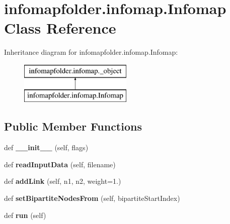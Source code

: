 \hypertarget{classinfomapfolder_1_1infomap_1_1Infomap}{}\section{infomapfolder.\+infomap.\+Infomap Class Reference}
\label{classinfomapfolder_1_1infomap_1_1Infomap}
Inheritance diagram for infomapfolder.\+infomap.\+Infomap\+:\begin{figure}[H]
\begin{center}
\leavevmode
\includegraphics[height=2.000000cm]{classinfomapfolder_1_1infomap_1_1Infomap}
\end{center}
\end{figure}
\subsection*{Public Member Functions}
\begin{DoxyCompactItemize}
\item 
\mbox{\label{classinfomapfolder_1_1infomap_1_1Infomap_aaff19679a8b96df2964007d33d1e7852}} 
def {\bfseries \+\_\+\+\_\+init\+\_\+\+\_\+} (self, flags)
\item 
\mbox{\label{classinfomapfolder_1_1infomap_1_1Infomap_ac378e2ba091a4b2bf40e989bf3cc54ed}} 
def {\bfseries read\+Input\+Data} (self, filename)
\item 
\mbox{\label{classinfomapfolder_1_1infomap_1_1Infomap_a1e6de8e85de69eba7082dd6628d794b1}} 
def {\bfseries add\+Link} (self, n1, n2, weight=1.)
\item 
\mbox{\label{classinfomapfolder_1_1infomap_1_1Infomap_ae0e760c416f6153e71810e62a2fda29f}} 
def {\bfseries set\+Bipartite\+Nodes\+From} (self, bipartite\+Start\+Index)
\item 
\mbox{\label{classinfomapfolder_1_1infomap_1_1Infomap_abbdd18e9238c483a532dec82e5ab1f27}} 
def {\bfseries run} (self)
\end{DoxyCompactItemize}
